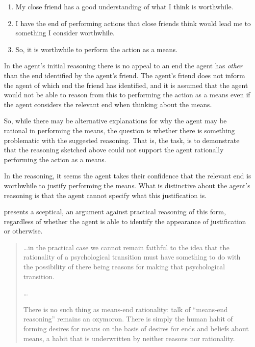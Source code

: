 \documentclass[10pt]{article}
\begin{document}
\begin{enumerate}
\item My close friend has a good understanding of what I think is worthwhile.
\item I have the end of performing actions that close friends think would lead me to something I consider worthwhile.
\item So, it is worthwhile to perform the action as a means.
\end{enumerate}

In the agent's initial reasoning there is no appeal to an end the agent has \emph{other} than the end identified by the agent's friend.
The agent's friend does not inform the agent of which end the friend has identified, and it is assumed that the agent would not be able to reason from this to performing the action as a means even if the agent considers the relevant end when thinking about the means.

So, while there may be alternative explanations for why the agent may be rational in performing the means, the question is whether there is something problematic with the suggested reasoning.
That is, the task, is to demonstrate that the reasoning sketched above could not support the agent rationally performing the action as a means.

In the reasoning, it seems the agent takes their confidence that the relevant end is worthwhile to justify performing the means.
What is distinctive about the agent's reasoning is that the agent cannot specify what this justification is.

\citeauthor{Smith:2004aa} presents a sceptical, \citeauthor{Hume:2011aa}an argument against practical reasoning of this form, regardless of whether the agent is able to identify the appearance of justification or otherwise.
\begin{quote}
  \dots in the practical case we cannot remain faithful to the idea that the rationality of a psychological transition must have something to do with the possibility of there being reasons for making that psychological transition.

  \dots

  There is no such thing as means-end rationality: talk of ``means-end reasoning'' remains an oxymoron.
  There is simply the human habit of forming desires for means on the basis of desires for ends and beliefs about means, a habit that is underwritten by neither reasons nor rationality.\nolinebreak
  \mbox{}\hfill\mbox{\citeyear[88]{Smith:2004aa}}
\end{quote}
\end{document}
